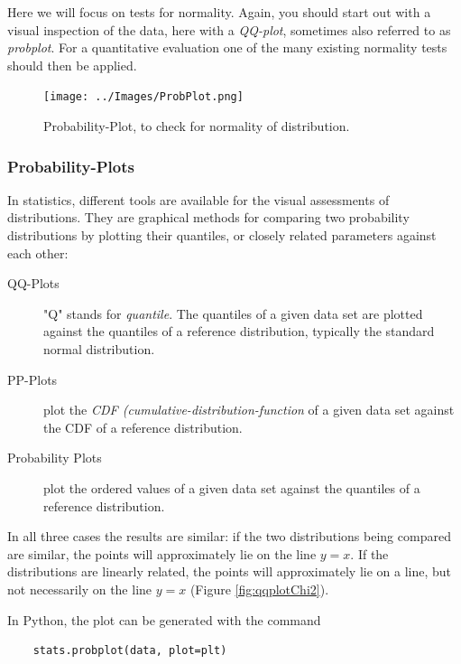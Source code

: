 Here we will focus on tests for normality. Again, you should start out with a visual inspection of the data, here with a \emph{QQ-plot}, sometimes also referred to as \emph{probplot}. For a quantitative evaluation one of the many existing normality tests should then be applied.

\begin{figure}
  \centering
  \texttt{[image: ../Images/ProbPlot.png]}\\
  \caption{Probability-Plot, to check for normality of distribution.}\label{fig:qqplot}
\end{figure}


\subsubsection{Probability-Plots} 

In statistics, different tools are available for the visual assessments of distributions. They are graphical methods for comparing two probability distributions by plotting their quantiles, or closely related parameters against each other:

\begin{description}
  \item[QQ-Plots] "Q" stands for \emph{quantile}. The quantiles of a given data set are plotted against the quantiles of a reference distribution, typically the standard normal distribution.
  \item[PP-Plots]  plot the \emph{CDF (cumulative-distribution-function} of a given data set against the CDF of a reference distribution.
  \item[Probability Plots]  plot the ordered values of a given data set against the quantiles of a reference distribution.
\end{description}

In all three cases the results are similar: if the two distributions being compared are similar, the points will approximately lie on the line $y = x$. If the distributions are linearly related, the points will approximately lie on a line, but not necessarily on the line $y = x$ (Figure \ref{fig:qqplotChi2}).

In Python, the plot can be generated with the command

\begin{lstlisting}
    stats.probplot(data, plot=plt)
\end{lstlisting}

